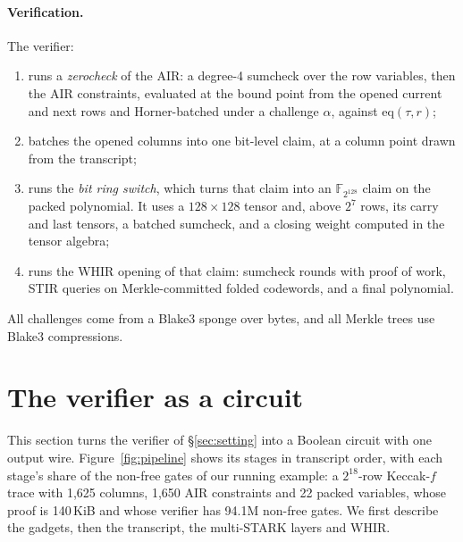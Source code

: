 \documentclass[11pt]{article}
\newcommand{\F}{\mathbb{F}_{2^{128}}}
\begin{document}
\paragraph{Verification.} The verifier:
\begin{enumerate}
  \item runs a \emph{zerocheck} of the AIR: a degree-4 sumcheck over the row
    variables, then the AIR constraints, evaluated at the bound point from the
    opened current and next rows and Horner-batched under a challenge $\alpha$,
    against $\mathrm{eq}(\tau,r)$;
  \item batches the opened columns into one bit-level claim, at a column point
    drawn from the transcript;
  \item runs the \emph{bit ring switch}, which turns that claim into an $\F$
    claim on the packed polynomial. It uses a $128\times128$ tensor and, above
    $2^7$ rows, its carry and last tensors, a batched sumcheck, and a closing
    weight computed in the tensor algebra;
  \item runs the WHIR opening of that claim: sumcheck rounds with proof of work,
    STIR queries on Merkle-committed folded codewords, and a final polynomial.
\end{enumerate}
All challenges come from a Blake3 sponge over bytes, and all Merkle trees use
Blake3 compressions.

\section{The verifier as a circuit}\label{sec:construction}

This section turns the verifier of \S\ref{sec:setting} into a Boolean circuit
with one output wire. Figure~\ref{fig:pipeline} shows its stages in transcript
order, with each stage's share of the non-free gates of our running example: a
$2^{18}$-row Keccak-$f$ trace with 1{,}625 columns, 1{,}650 AIR constraints and
22 packed variables, whose proof is 140\,KiB and whose verifier has 94.1M
non-free gates. We first describe the gadgets, then the transcript, the
multi-STARK layers and WHIR.
\end{document}

